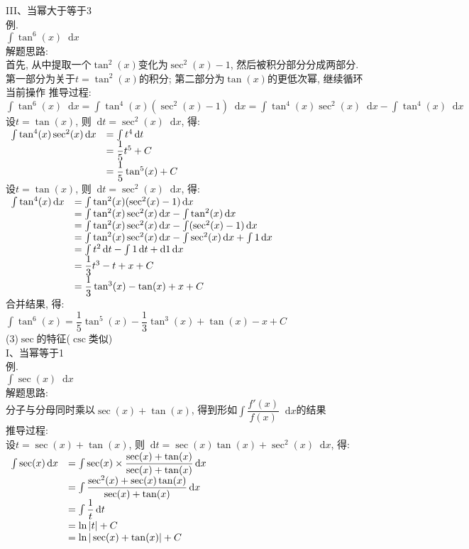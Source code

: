 \documentclass[UTF8, fontset=ubuntu, fleqn, fleqn]{ctexart}
\newcommand*{\dif}{\mathop{}\!\mathrm{d}}
\begin{document}
III、当幂大于等于3\\
例.\\
$\int\tan^6(x)\dif x$\\
解题思路:\\
首先, 从中提取一个$\tan^2(x)$变化为$\sec^2(x)-1$, 然后被积分部分分成两部分. 第一部分为关于$t=\tan^2(x)$的积分; 第二部分为$\tan(x)$的更低次幂, 继续循环当前操作
推导过程:\\
$\int\tan^6(x)\dif x=\int\tan^4(x)(\sec^2(x)-1)\dif x=\int\tan^4(x)\sec^2(x)\dif x-\int\tan^4(x)\dif x$\\
设$t=\tan(x)$, 则$\dif t=\sec^2(x)\dif x$, 得:\\
$\begin{array}{r l}
\int\tan^4(x)\sec^2(x)\dif x & =\int t^4\dif t\\
& =\dfrac{1}{5}t^5+C\\[1ex]
& =\dfrac{1}{5}\tan^5(x)+C
\end{array}$\\[1ex]
设$t=\tan(x)$, 则$\dif t=\sec^2(x)\dif x$, 得:\\
$\begin{array}{r l}
\int\tan^4(x)\dif x & =\int\tan^2(x)(\sec^2(x)-1)\dif x\\
& =\int\tan^2(x)\sec^2(x)\dif x-\int\tan^2(x)\dif x\\
& =\int\tan^2(x)\sec^2(x)\dif x-\int(\sec^2(x)-1)\dif x\\
& =\int\tan^2(x)\sec^2(x)\dif x-\int\sec^2(x)\dif x+\int 1\dif x\\
& =\int t^2\dif t-\int 1\dif t+\dif 1\dif x\\
& =\dfrac{1}{3}t^3-t+x+C\\[1ex]
& =\dfrac{1}{3}\tan^3(x)-\tan(x)+x+C
\end{array}$\\[1ex]
合并结果, 得:\\
$\int\tan^6(x)=\dfrac{1}{5}\tan^5(x)-\dfrac{1}{3}\tan^3(x)+\tan(x)-x+C$\\[4ex]

(3)$\sec$的特征($\csc$类似)\\
I、当幂等于1\\
例.\\
$\int\sec(x)\dif x$\\
解题思路:\\
分子与分母同时乘以$\sec(x)+\tan(x)$, 得到形如$\int\dfrac{f'(x)}{f(x)}\dif x$的结果\\
推导过程:\\
设$t=\sec(x)+\tan(x)$, 则$\dif t=\sec(x)\tan(x)+\sec^2(x)\dif x$, 得:\\
$\begin{array}{r l}
\int\sec(x)\dif x & =\int\sec(x)\times\dfrac{\sec(x)+\tan(x)}{\sec(x)+\tan(x)}\dif x\\[1ex]
& =\int\dfrac{\sec^2(x)+\sec(x)\tan(x)}{\sec(x)+\tan(x)}\dif x\\[1ex]
& =\int\dfrac{1}{t}\dif t\\[1ex]
& =\ln|t|+C\\
& =\ln|\sec(x)+\tan(x)|+C
\end{array}$\\[2ex]
\end{document}
